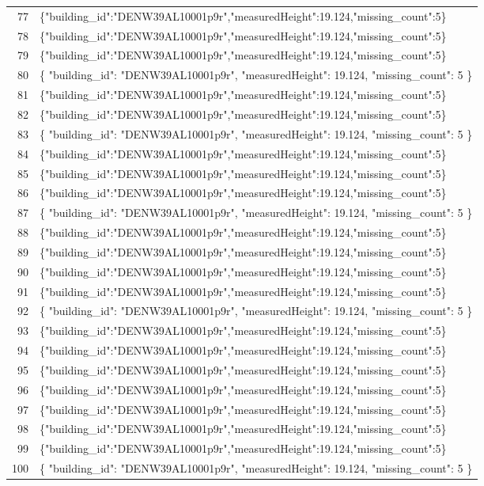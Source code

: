 \documentclass[a4paper,11pt]{article}
\begin{document}
\begin{table}[ht]
\begin{tabular}{r p{12cm}}
77 & \{"building\_id":"DENW39AL10001p9r","measuredHeight":19.124,"missing\_count":5\} \\
78 & \{"building\_id":"DENW39AL10001p9r","measuredHeight":19.124,"missing\_count":5\} \\
79 & \{"building\_id":"DENW39AL10001p9r","measuredHeight":19.124,"missing\_count":5\} \\
80 & \{
  "building\_id": "DENW39AL10001p9r",
  "measuredHeight": 19.124,
  "missing\_count": 5
\} \\
81 & \{"building\_id":"DENW39AL10001p9r","measuredHeight":19.124,"missing\_count":5\} \\
82 & \{"building\_id":"DENW39AL10001p9r","measuredHeight":19.124,"missing\_count":5\} \\
83 & \{
  "building\_id": "DENW39AL10001p9r",
  "measuredHeight": 19.124,
  "missing\_count": 5
\} \\
84 & \{"building\_id":"DENW39AL10001p9r","measuredHeight":19.124,"missing\_count":5\} \\
85 & \{"building\_id":"DENW39AL10001p9r","measuredHeight":19.124,"missing\_count":5\} \\
86 & \{"building\_id":"DENW39AL10001p9r","measuredHeight":19.124,"missing\_count":5\} \\
87 & \{
  "building\_id": "DENW39AL10001p9r",
  "measuredHeight": 19.124,
  "missing\_count": 5
\} \\
88 & \{"building\_id":"DENW39AL10001p9r","measuredHeight":19.124,"missing\_count":5\} \\
89 & \{"building\_id":"DENW39AL10001p9r","measuredHeight":19.124,"missing\_count":5\} \\
90 & \{"building\_id":"DENW39AL10001p9r","measuredHeight":19.124,"missing\_count":5\} \\
91 & \{"building\_id":"DENW39AL10001p9r","measuredHeight":19.124,"missing\_count":5\} \\
92 & \{
  "building\_id": "DENW39AL10001p9r",
  "measuredHeight": 19.124,
  "missing\_count": 5
\} \\
93 & \{"building\_id":"DENW39AL10001p9r","measuredHeight":19.124,"missing\_count":5\} \\
94 & \{"building\_id":"DENW39AL10001p9r","measuredHeight":19.124,"missing\_count":5\} \\
95 & \{"building\_id":"DENW39AL10001p9r","measuredHeight":19.124,"missing\_count":5\} \\
96 & \{"building\_id":"DENW39AL10001p9r","measuredHeight":19.124,"missing\_count":5\} \\
97 & \{"building\_id":"DENW39AL10001p9r","measuredHeight":19.124,"missing\_count":5\} \\
98 & \{"building\_id":"DENW39AL10001p9r","measuredHeight":19.124,"missing\_count":5\} \\
99 & \{"building\_id":"DENW39AL10001p9r","measuredHeight":19.124,"missing\_count":5\} \\
100 & \{
  "building\_id": "DENW39AL10001p9r",
  "measuredHeight": 19.124,
  "missing\_count": 5
\} \\
\hline
\end{tabular}
\end{table}
\end{document}

